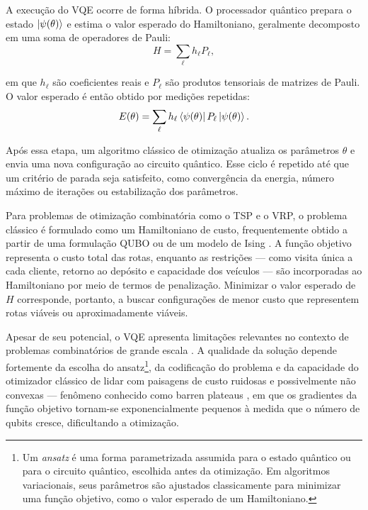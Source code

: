 A execução do VQE ocorre de forma híbrida. O processador quântico prepara o estado $\ket{\psi(\theta)}$ e estima o valor esperado do Hamiltoniano, geralmente decomposto em uma soma de operadores de Pauli:
\begin{equation}
    H = \sum_{\ell} h_{\ell} P_{\ell},
\end{equation}

\noindent em que $h_{\ell}$ são coeficientes reais e $P_{\ell}$ são produtos tensoriais de matrizes de Pauli. O valor esperado é então obtido por medições repetidas:
\begin{equation}
    E(\theta) = \sum_{\ell} h_{\ell}
    \bra{\psi(\theta)} P_{\ell} \ket{\psi(\theta)}.
\end{equation}

Após essa etapa, um algoritmo clássico de otimização atualiza os parâmetros $\theta$ e envia uma nova configuração ao circuito quântico. Esse ciclo é repetido até que um critério de parada seja satisfeito, como convergência da energia, número máximo de iterações ou estabilização dos parâmetros.

Para problemas de otimização combinatória como o TSP e o VRP, o problema clássico é formulado como um Hamiltoniano de custo, frequentemente obtido a partir de uma formulação QUBO ou de um modelo de Ising \cite{lucas2014ising}. A função objetivo representa o custo total das rotas, enquanto as restrições — como visita única a cada cliente, retorno ao depósito e capacidade dos veículos — são incorporadas ao Hamiltoniano por meio de termos de penalização. Minimizar o valor esperado de $H$ corresponde, portanto, a buscar configurações de menor custo que representem rotas viáveis ou aproximadamente viáveis.

Apesar de seu potencial, o VQE apresenta limitações relevantes no contexto de problemas combinatórios de grande escala \cite{cerezo2021variational}. A qualidade da solução depende fortemente da escolha do ansatz\footnote{Um \textit{ansatz} é uma forma parametrizada assumida para o estado quântico ou para o circuito quântico, escolhida antes da otimização. Em algoritmos variacionais, seus parâmetros são ajustados classicamente para minimizar uma função objetivo, como o valor esperado de um Hamiltoniano.}, da codificação do problema e da capacidade do otimizador clássico de lidar com paisagens de custo ruidosas e possivelmente não convexas — fenômeno conhecido como barren plateaus \cite{mcclean2018barren}, em que os gradientes da função objetivo tornam-se exponencialmente pequenos à medida que o número de qubits cresce, dificultando a otimização. 

